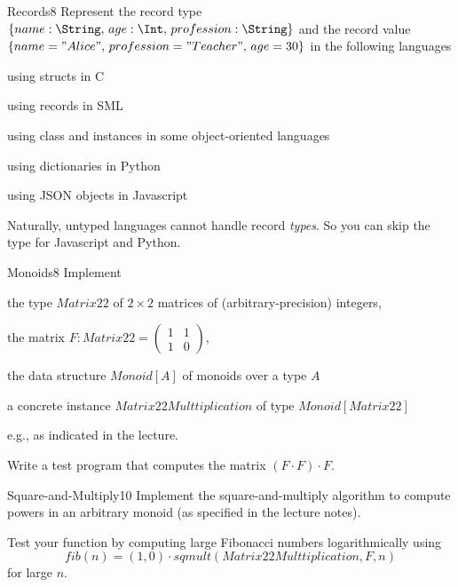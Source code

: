 \documentclass[a4paper]{article}
\begin{document}
\header


\begin{problem}{Records}{8}
Represent the record type $\{name:\String,\, age:\Int,\, profession:\String\}$ and the record value $\{name="Alice",\, profession="Teacher",\, age=30\}$ in the following languages
\begin{compactitem}
 \item using structs in C
 \item using records in SML
 \item using class and instances in some object-oriented languages
 \item using dictionaries in Python
 \item using JSON objects in Javascript
\end{compactitem}

Naturally, untyped languages cannot handle record \emph{types}. So you can skip the type for Javascript and Python.
\end{problem}

\begin{problem}{Monoids}{8}
Implement
\begin{compactitem}
 \item the type $Matrix22$ of $2\times 2$ matrices of (arbitrary-precision) integers,
 \item the matrix $F:Matrix22=\begin{pmatrix}1&1\\1&0\end{pmatrix}$,
 \item the data structure $Monoid[A]$ of monoids over a type $A$
 \item a concrete instance $Matrix22Multtiplication$ of type $Monoid[Matrix22]$
\end{compactitem}
e.g., as indicated in the lecture.

Write a test program that computes the matrix $(F\cdot F)\cdot F$.
\end{problem}

\begin{problem}{Square-and-Multiply}{10}
Implement the square-and-multiply algorithm to compute powers in an arbitrary monoid (as specified in the lecture notes).

Test your function by computing large Fibonacci numbers logarithmically using
\[fib(n)=(1,0)\cdot sqmult(Matrix22Multtiplication, F, n)\]
for large $n$.
\end{problem}
\end{document}
